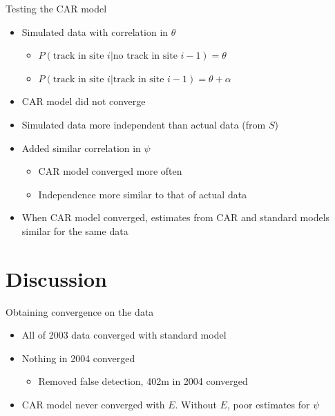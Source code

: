 \documentclass{beamer}
\begin{document}

\begin{frame}{Testing the CAR model}
	\begin{itemize}
		\item Simulated data with correlation in $\theta$
		\begin{itemize}
			\item $P(\text{track in site }i|\text{no track in site }i-1)=\theta$
			\item $P(\text{track in site }i|\text{track in site }i-1)=\theta+
			\alpha$
		\end{itemize}
		\item CAR model did not converge
		\item Simulated data more independent than actual data (from $S$)
		\item Added similar correlation in $\psi$
		\begin{itemize}
			\item CAR model converged more often
			\item Independence more similar to that of actual data
		\end{itemize}
		\item When CAR model converged, estimates from CAR and standard models
		similar for the same data
	\end{itemize}
\end{frame}

\section{Discussion}
\begin{frame}{Obtaining convergence on the data}
	\begin{itemize}
		\item All of 2003 data converged with standard model
		\item Nothing in 2004 converged
		\begin{itemize}
			\item Removed false detection, 402m in 2004 converged
		\end{itemize}
		\item CAR model never converged with $E$. Without $E$, poor
		estimates for $\psi$
	\end{itemize}
\end{frame}
\end{document}

